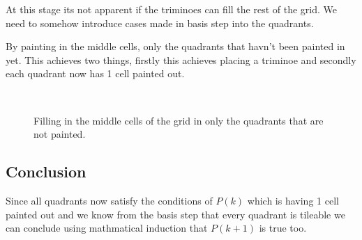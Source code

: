 \noindent
 At this stage its not apparent if the triminoes can fill the rest of the grid. We need to somehow introduce cases made in basis step into the quadrants.

\pagebreak
\noindent
By painting in the middle cells, only the quadrants that havn't been painted in yet. This achieves two things, firstly this achieves placing a triminoe and secondly each quadrant now has 1 cell painted out. 


\begin{figure}[H]
	\centering
	\\
	\vspace{-10pt}
	\caption{Filling in the middle cells of the grid in only the quadrants that are not painted.}
	\label{T1-figure4}
\end{figure}

\subsection{Conclusion}
Since all quadrants now satisfy the conditions of $P(k)$ which is having 1 cell painted out and we know from the basis step that every quadrant is tileable we can conclude using mathmatical induction that $P(k+1)$ is true too.
















